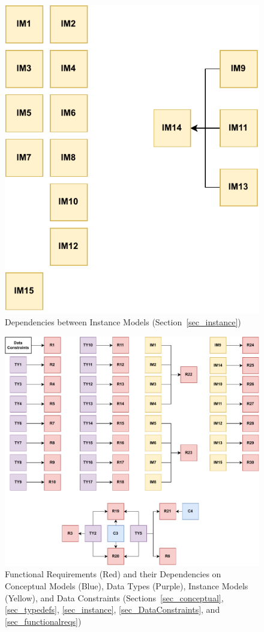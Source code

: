 \vspace*{\fill}
\begin{figure}[tbh]
    \centering
    \includegraphics[width=0.5\linewidth]{figures/instance2instance.pdf}
    \caption[Dependencies between Instance Models]{Dependencies between
        Instance Models (Section~\ref{sec_instance})}
    \label{fig:IM}
\end{figure}
\vspace*{\fill}

\begin{figure}[tbh]
    \centering
    \includegraphics[width=\linewidth]{figures/reqs2All.pdf}
    \caption[Functional Requirements and their Dependencies on Conceptual
    Models, Data Types, Instance Models, and Data Constraints]{Functional
    Requirements (Red) and
    their Dependencies on Conceptual Models (Blue), Data Types (Purple),
    Instance Models (Yellow), and Data Constraints
    (Sections~\ref{sec_conceptual}, \ref{sec_typedefs}, \ref{sec_instance},
    \ref{sec_DataConstraints}, and \ref{sec_functionalreqs})}
    \label{fig:M2R}
\end{figure}